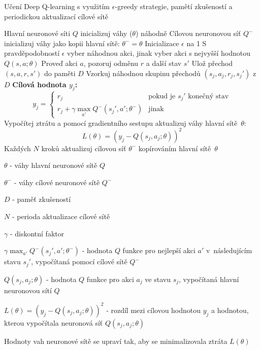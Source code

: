 \begin{algorithm}[H]
  \caption{Učení Deep Q-learning s využitím $\epsilon$-greedy strategie, pamětí zkušeností a periodickou aktualizací cílové sítě}
  \begin{algorithmic}[1]
    \State Hlavní neuronové síti $Q$ inicializuj váhy ($\theta$) náhodně
    \State Cílovou neuronovou síť $Q^{-}$ inicializuj váhy jako kopii hlavní sítě: $\theta^{-} = \theta$
    \State Inicializace $\epsilon$ na 1
            \State S pravděpodobností $\epsilon$ vyber náhodnou akci, jinak vyber akci s nejvyšší hodnotou $Q(s, a; \theta)$
            \State Proveď akci $a$, pozoruj odměnu $r$ a další stav $s'$
            \State Ulož přechod $(s, a, r, s')$ do paměti $D$
              \State Vzorkuj náhodnou skupinu přechodů $(s_j, a_j, r_j, s_j')$ z $D$
                  \State \textbf{Cílová hodnota $y_j$:}
                  \[
                  y_j = 
                  \begin{cases} 
                  r_j & \text{pokud je } s_j' \text{ konečný stav} \\
                  r_j + \gamma \max_{a'} Q^{-}(s_j', a'; \theta^{-}) & \text{jinak}
                  \end{cases}
                  \]
                  \State Vypočítej ztrátu a pomocí gradientního sestupu aktualizuj váhy hlavní sítě~$\theta$:
                   \[
                  L(\theta) = \left(y_j - Q(s_j, a_j; \theta)\right)^2
                  \]
              \EndFor
            \EndIf
            \State Každých $N$ kroků aktualizuj cílovou síť $\theta^{-}$ kopírováním hlavní sítě~$\theta$
      \EndFor
    \EndFor
  \end{algorithmic}
\end{algorithm}
\begin{myitemize}
  \item \(\theta\) - váhy hlavní neuronové sítě \(Q\)
  \item \(\theta^{-}\) - váhy cílové neuronové sítě \(Q^{-}\)
  \item $D$ - paměť zkušeností
  \item $N$ - perioda aktualizace cílové sítě
  \item $\gamma$ - diskontní faktor
  \item $\gamma \max_{a'} Q^{-}(s_j', a'; \theta^{-})$ - hodnota $Q$ funkce pro nejlepší akci $a'$ v~následujícím stavu $s_j'$, vypočítaná pomocí cílové sítě $Q^{-}$
  \item $Q(s_j, a_j; \theta)$ - hodnota $Q$ funkce pro akci $a_j$ ve stavu $s_j$, vypočítaná hlavní neuronovou sítí $Q$
  \item $L(\theta) = \left(y_j - Q(s_j, a_j; \theta)\right)^2$ - rozdíl mezi cílovou hodnotou $y_j$ a hodnotou, kterou vypočítala neuronová síť $Q(s_j, a_j; \theta)$
  \item Hodnoty vah neuronové sítě se upraví tak, aby se minimalizovala ztráta $L(\theta)$
\end{myitemize}
